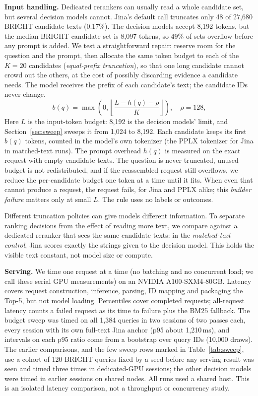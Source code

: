 \documentclass[conference]{IEEEtran}
\begin{document}
{\textbf{Input handling.} Dedicated rerankers can usually read a whole candidate set, but several decision models cannot. Jina's default call truncates only 48 of 27,680 BRIGHT candidate texts (0.17\%). The decision models accept 8,192 tokens, but the median BRIGHT candidate set is 8,097 tokens, so 49\% of sets overflow before any prompt is added. We test a straightforward repair: reserve room for the question and the prompt, then allocate the same token budget to each of the $K=20$ candidates (\emph{equal-prefix truncation}), so that one long candidate cannot crowd out the others, at the cost of possibly discarding evidence a candidate needs. The model receives the prefix of each candidate's text; the candidate IDs never change.
\begin{equation}
 b(q)=\max\!\left(0,\left\lfloor\frac{L-h(q)-\rho}{K}\right\rfloor\right),\quad \rho=128, \label{eq:budget}
\end{equation}
Here $L$ is the input-token budget: 8,192 is the decision models' limit, and Section~\ref{sec:sweep} sweeps it from 1,024 to 8,192. Each candidate keeps its first $b(q)$ tokens, counted in the model's own tokenizer (the PPLX tokenizer for Jina in matched-text runs). The prompt overhead $h(q)$ is measured on the exact request with empty candidate texts. The question is never truncated, unused budget is not redistributed, and if the reassembled request still overflows, we reduce the per-candidate budget one token at a time until it fits. When even that cannot produce a request, the request fails, for Jina and PPLX alike; this \emph{builder failure} matters only at small $L$. The rule uses no labels or outcomes.

Different truncation policies can give models different information. To separate ranking decisions from the effect of reading more text, we compare against a dedicated reranker that sees the same candidate texts: in the \emph{matched-text control}, Jina scores exactly the strings given to the decision model. This holds the visible text constant, not model size or compute.

\textbf{Serving.} We time one request at a time (no batching and no concurrent load; we call these serial GPU measurements) on an NVIDIA A100-SXM4-80GB. Latency covers request construction, inference, parsing, ID mapping and packaging the Top-5, but not model loading. Percentiles cover completed requests; all-request latency counts a failed request as its time to failure plus the BM25 fallback. The budget sweep was timed on all 1,384 queries in two sessions of two passes each, every session with its own full-text Jina anchor (p95 about 1,210\,ms), and intervals on each p95 ratio come from a bootstrap over query IDs (10,000 draws). The earlier comparisons, and the few sweep rows marked in Table~\ref{tab:sweep}, use a cohort of 120 BRIGHT queries fixed by a seed before any serving result was seen and timed three times in dedicated-GPU sessions; the other decision models were timed in earlier sessions on shared nodes. All runs used a shared host. This is an isolated latency comparison, not a throughput or concurrency study.

}
\end{document}
